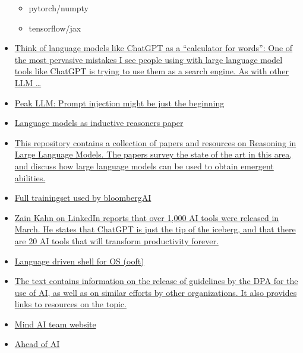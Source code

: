 \begin{itemize}
\begin{itemize}
  \item
    pytorch/numpty
  \item
    tensorflow/jax
  \end{itemize}
\item
  \href{https://simonwillison.net/2023/Apr/2/calculator-for-words/}{Think
  of language models like ChatGPT as a ``calculator for words'': One of
  the most pervasive mistakes I see people using with large language
  model tools like ChatGPT is trying to use them as a search engine. As
  with other LLM \ldots{}}
\item
  \href{https://ihavemanythoughts.substack.com/p/peak-llm}{Peak LLM:
  Prompt injection might be just the beginning}
\item
  \href{https://sentic.net/language-models-as-inductive-reasoners.pdf}{Language
  models as inductive reasoners paper}
\item
  \href{https://github.com/jeffhj/LM-reasoning}{This repository contains
  a collection of papers and resources on Reasoning in Large Language
  Models. The papers survey the state of the art in this area, and
  discuss how large language models can be used to obtain emergent
  abilities.}
\item
  \href{https://mobile.twitter.com/omarsar0/status/1641788196550856704}{Full
  trainingset used by bloombergAI}
\item
  \href{https://www.linkedin.com/posts/zainkahn_1000-ai-tools-were-released-in-march-activity-7048285306101358592-4wAA?utm_source=share\&utm_medium=member_android}{Zain
  Kahn on LinkedIn reports that over 1,000 AI tools were released in
  March. He states that ChatGPT is just the tip of the iceberg, and that
  there are 20 AI tools that will transform productivity forever.}
\item
  \href{https://www.reddit.com/r/MachineLearning/comments/129wzdk/p_engshell_a_gpt4_driven_englishlanguage_shell/}{Language
  driven shell for OS (ooft)}
\item
  \href{https://www.linkedin.com/posts/ezra-eeman-8a5ba64_dpa-just-released-its-guidelines-for-the-activity-7048985893910519808-921y?utm_source=share\&utm_medium=member_android}{The
  text contains information on the release of guidelines by the DPA for
  the use of AI, as well as on similar efforts by other organizations.
  It also provides links to resources on the topic.}
\item
  \href{https://mind.ai/technology}{Mind AI team website}
\item
  \href{https://magazine.sebastianraschka.com/archive}{Ahead of AI
}
\end{itemize}
